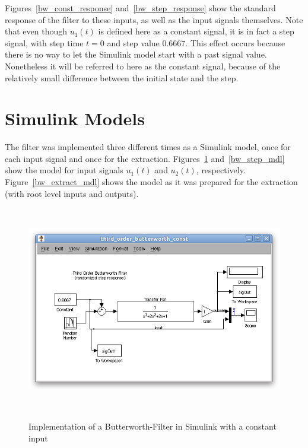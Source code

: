 Figures~\ref{bw_const_response} and~\ref{bw_step_response} show the standard response of the filter to these inputs, as well as the input signals themselves. Note that even though $u_1(t)$ is defined here as a constant signal, it is in fact a step signal, with step time $t=0$ and step value $0.6667$. This effect occurs because there is no way to let the Simulink model start with a past signal value. Nonetheless it will be referred to here as the constant signal, because of the relatively small difference between the initial state and the step.


\section{Simulink Models}

The filter was implemented three different times as a Simulink model, once for each input signal and once for the extraction. Figures~\ref{bw_const_mdl} and~\ref{bw_step_mdl} show the model for input signals $u_1(t)$ and $u_2(t)$, respectively. Figure~\ref{bw_extract_mdl} shows the model as it was prepared for the extraction (with root level inputs and outputs).

\begin{figure}
\begin{center}
\includegraphics[height=9cm]{media/bw/bw_const_mdl}\\
\end{center}
\caption{Implementation of a Butterworth-Filter in Simulink with a constant input}
\label{bw_const_mdl}
\end{figure}

